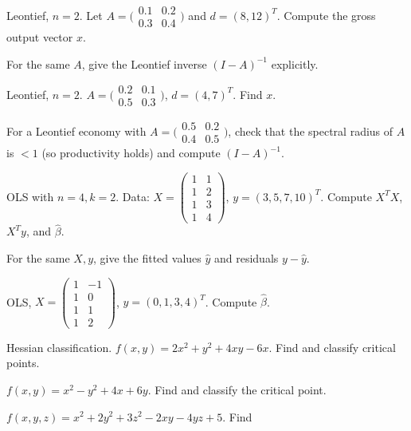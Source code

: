 \begin{problems}
  \item Leontief, $n = 2$. Let
        $A = \bigl(\begin{smallmatrix} 0.1 & 0.2 \\ 0.3 & 0.4 \end{smallmatrix}\bigr)$
        and $d = (8, 12)^{T}$. Compute the gross output vector $x$.
  \item For the same $A$, give the Leontief inverse $(I - A)^{-1}$
        explicitly.
  \item Leontief, $n = 2$.
        $A = \bigl(\begin{smallmatrix} 0.2 & 0.1 \\ 0.5 & 0.3 \end{smallmatrix}\bigr)$,
        $d = (4, 7)^{T}$. Find $x$.
  \item For a Leontief economy with
        $A = \bigl(\begin{smallmatrix} 0.5 & 0.2 \\ 0.4 & 0.5 \end{smallmatrix}\bigr)$,
        check that the spectral radius of $A$ is $< 1$ (so productivity
        holds) and compute $(I - A)^{-1}$.
  \item OLS with $n = 4, k = 2$. Data:
        $X = \begin{pmatrix} 1 & 1 \\ 1 & 2 \\ 1 & 3 \\ 1 & 4 \end{pmatrix}$,
        $y = (3, 5, 7, 10)^{T}$. Compute $X^{T} X$, $X^{T} y$, and
        $\hat{\beta}$.
  \item For the same $X, y$, give the fitted values $\hat{y}$ and residuals
        $y - \hat{y}$.
  \item OLS,
        $X = \begin{pmatrix} 1 & -1 \\ 1 & 0 \\ 1 & 1 \\ 1 & 2 \end{pmatrix}$,
        $y = (0, 1, 3, 4)^{T}$. Compute $\hat{\beta}$.
  \item Hessian classification.
        $f(x, y) = 2 x^{2} + y^{2} + 4 x y - 6 x$. Find and classify
        critical points.
  \item $f(x, y) = x^{2} - y^{2} + 4 x + 6 y$. Find and classify the
        critical point.
  \item $f(x, y, z) = x^{2} + 2 y^{2} + 3 z^{2} - 2 x y - 4 y z + 5$. Find

\end{problems}
